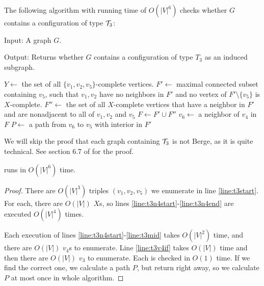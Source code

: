 The following algorithm with running time of $O(|V|^6)$ checks whether $G$ contains a configuration of type $\mathcal{T}_3$:

\begin{alg}
	\label{alg:t3}
	Input: A graph $G$.

	\noindent Output: Returns whether $G$ contains a configuration of type $T_3$ as an induced subgraph.
\end{alg}

\begin{algorithmic}[1]
		\ls $Y \gets$ the set of all $\{v_1, v_2, v_5\}$-complete vertices.
			\ls $F' \gets$ maximal connected subset containing $v_5$, such that $v_1, v_2$ \label{line:t3n4start}
			\lsx have no neighbors in $F'$ and no vertex of $F'\setminus\{v_5\}$ is $X$-complete.
			\ls $F'' \gets$ the set of all $X$-complete vertices that have a neighbor in 
			\lsx $F'$ and are nonadjacent to all of $v_1, v_2$ and $v_5$
			\ls $F \gets F' \cup F''$ \label{line:t3mid}
					\ls $v_6 \gets$ a neighbor of $v_4$ in $F$
							\ls $P \gets$ a path from $v_6$ to $v_5$ with interior in $F'$
							\ls \RETURN \TRUE {}
						\mEndIf
					\mEndFor
				\mEndIf
			\mEndFor \label{line:t3n4end}
		\mEndFor
	\mEndFor
	\ls \RETURN \FALSE
	\mEndProcedure
\end{algorithmic}

We will skip the proof that each graph containing $\mathcal{T}_3$ is not Berge, as it is quite technical. See section 6.7 of \cite{MC05} for the proof.

\begin{theorem}
	 runs in $O(|V|^6)$ time.
\end{theorem}
\begin{proof}
	There are $O(|V|^3)$ triples $(v_1, v_2, v_5)$ we enumerate in line \ref{line:t3start}. For each, there are $O(|V|)$ $X$s, so lines \ref{line:t3n4start}-\ref{line:t3n4end} are executed $O(|V|^4)$ times.

	Each execution of lines \ref{line:t3n4start}-\ref{line:t3mid} takes $O(|V|^2)$ time, and there are $O(|V|)$ $v_4$s to enumerate. Line \ref{line:t3v4if} takes $O(|V|)$ time and then there are $O(|V|)$ $v_3$ to enumerate. Each is checked in $O(1)$ time. If we find the correct one, we calculate a path $P$, but return right away, so we calculate $P$ at most once in whole algorithm.
\end{proof}

